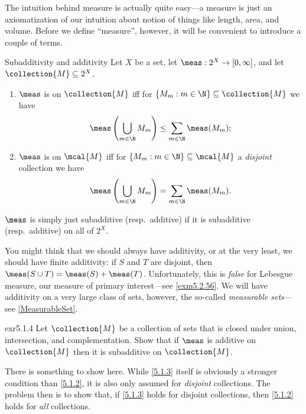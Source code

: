 The intuition behind measure is actually quite easy---a measure is just an axiomatization of our intuition about notion of things like length, area, and volume.  Before we define ``measure'', however, it will be convenient to introduce a couple of terms.
\begin{dfn}{Subadditivity and additivity}{}
Let $X$ be a set, let $\meas :2^X\rightarrow [0,\infty ]$, and let $\collection{M}\subseteq 2^X$.  
\begin{enumerate}
\item $\meas$ is  on $\collection{M}$ iff for $\{ M_m:m\in \N \} \subseteq \collection{M}$ we have
\begin{equation}\label{5.1.2}
\meas \left( \bigcup _{m\in \N}M_m\right) \leq \sum _{m\in \N}\meas (M_m);
\end{equation}
\item $\meas$ is  on $\mcal{M}$ iff for $\{ M_m:m\in \N \} \subseteq \mcal{M}$ a \emph{disjoint} collection we have
\begin{equation}\label{5.1.3}
\meas \left( \bigcup _{m\in \N}M_m\right) =\sum _{m\in \N}\meas (M_m).
\end{equation}
\end{enumerate}
$\meas$ is simply just subadditive (resp.~additive) if it is subadditive (resp.~additive) on all of $2^X$.
\begin{rmk}
You might think that we should always have additivity, or at the very least, we should have finite additivity:  if $S$ and $T$ are disjoint, then $\meas (S\cup T)=\meas (S)+\meas (T)$.  Unfortunately, this is \emph{false} for Lebesgue measure, our measure of primary interest---see \cref{exm5.2.56}.  We will have additivity on a very large class of sets, however, the so-called \emph{measurable sets}---see \cref{MeasurableSet}.
\end{rmk}
\end{dfn}
\begin{exr}{}{exr5.1.4}
Let $\collection{M}$ be a collection of sets that is closed under union, intersection, and complementation.  Show that if $\meas$ is additive on $\collection{M}$ then it is subadditive on $\collection{M}$.
\begin{rmk}
There is something to show here.  While \eqref{5.1.3} itself is obviously a stronger condition than \eqref{5.1.2}, it is also only assumed for \emph{disjoint} collections.  The problem then is to show that, if \eqref{5.1.3} holds for disjoint collections, then \eqref{5.1.2} holds for \emph{all} collections.
\end{rmk}
\end{exr}

